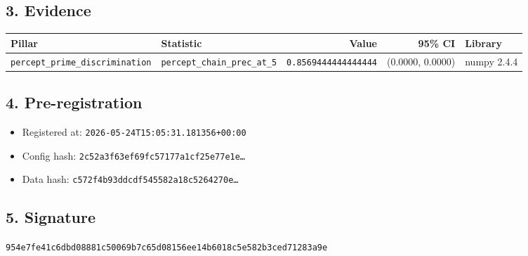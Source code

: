 \documentclass{article}
\begin{document}
\subsection*{3. Evidence}
\begin{tabular}{llrrl}\toprule
\textbf{Pillar} & \textbf{Statistic} & \textbf{Value} & \textbf{95\% CI} & \textbf{Library} \\\midrule
\texttt{percept\_prime\_discrimination} & \texttt{percept\_chain\_prec\_at\_5} & \texttt{0.8569444444444444} & (0.0000, 0.0000) & numpy 2.4.4 \\
\bottomrule\end{tabular}
\subsection*{4. Pre-registration}
\begin{itemize}
\item Registered at: \texttt{2026-05-24T15:05:31.181356+00:00}
\item Config hash: \texttt{2c52a3f63ef69fc57177a1cf25e77e1e\dots}
\item Data hash: \texttt{c572f4b93ddcdf545582a18c5264270e\dots}
\end{itemize}
\subsection*{5. Signature}
\texttt{954e7fe41c6dbd08881c50069b7c65d08156ee14b6018c5e582b3ced71283a9e}\\
\end{document}

